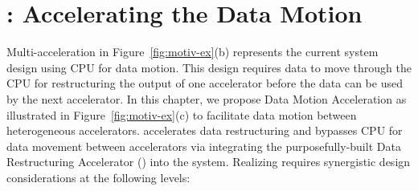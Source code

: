 \section{\dmx: Accelerating the Data Motion}
\label{sec:dmx}

Multi-acceleration in Figure~\ref{fig:motiv-ex}(b) represents the current system design using CPU for data motion. This design requires data to move through the CPU for restructuring the output of one accelerator before the data can be used by the next accelerator. 
%
In this chapter, we propose Data Motion Acceleration as illustrated in Figure~\ref{fig:motiv-ex}(c) to facilitate data motion between heterogeneous accelerators. %
%
\dmx accelerates data restructuring and bypasses CPU for data movement between accelerators via integrating the purposefully-built Data Restructuring Accelerator (\drx) into the system.
%
%
%
Realizing \dmx requires synergistic design considerations at the following levels: %
%
